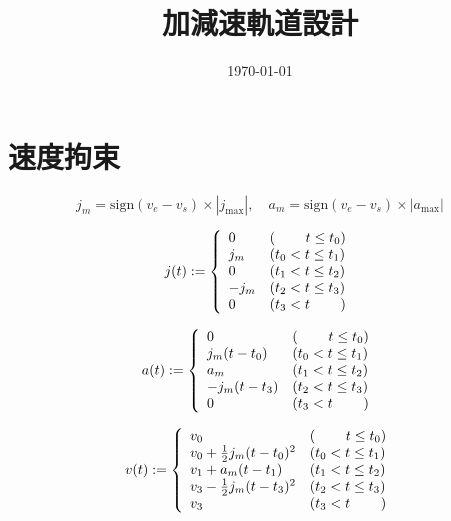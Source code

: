 \documentclass[a5paper]{ltjsarticle}
\title{加減速軌道設計}
\date{\today}
\begin{document}
\maketitle

\section{速度拘束}

$$
    j_m = \mathrm{sign}(v_e-v_s) \times|j_{\max}|
    ,\quad
    a_m = \mathrm{sign}(v_e-v_s) \times|a_{\max}|
$$

$$
    j(t) :=
    \left\{ \begin{array}{ll}
        0    & (\hspace{2.2em}t \le t_0) \\
        j_m  & (t_0 < t \le t_1)         \\
        0    & (t_1 < t \le t_2)         \\
        -j_m & (t_2 < t \le t_3)         \\
        0    & (t_3 < t \hspace{2.2em})
    \end{array} \right.
$$

$$
    a(t) :=
    \left\{ \begin{array}{ll}
        0           & (\hspace{2.2em}t \le t_0) \\
        j_m(t-t_0)  & (t_0 < t \le t_1)         \\
        a_m         & (t_1 < t \le t_2)         \\
        -j_m(t-t_3) & (t_2 < t \le t_3)         \\
        0           & (t_3 < t \hspace{2.2em})
    \end{array} \right.
$$

$$
    v(t) :=
    \left\{ \begin{array}{ll}
        v_0                           & (\hspace{2.2em} t \le t_0) \\
        v_0 + \frac{1}{2}j_m(t-t_0)^2 & (t_0 < t \le t_1)          \\
        v_1 + a_m(t-t_1)              & (t_1 < t \le t_2)          \\
        v_3 - \frac{1}{2}j_m(t-t_3)^2 & (t_2 < t \le t_3)          \\
        v_3                           & (t_3 < t \hspace{2.2em})
    \end{array} \right.
$$
\end{document}
